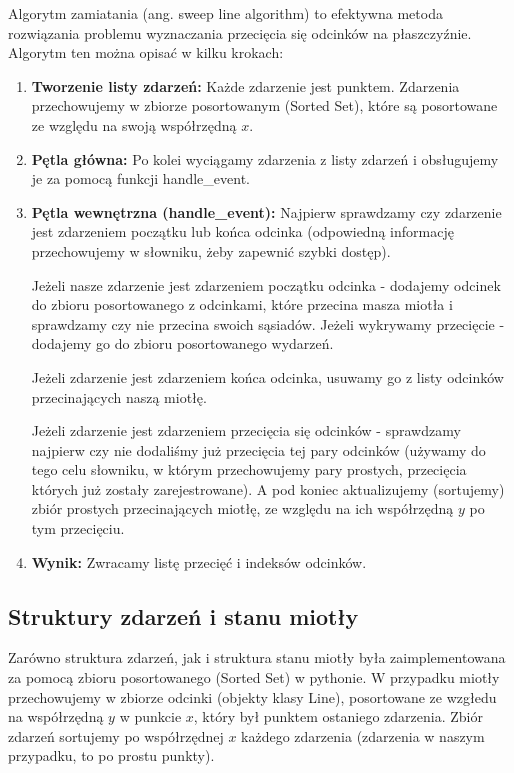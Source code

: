 \quad Algorytm zamiatania (ang. sweep line algorithm) to efektywna metoda rozwiązania problemu wyznaczania przecięcia się odcinków na płaszczyźnie. Algorytm ten można opisać w kilku krokach:


\begin{enumerate}
    \item \textbf{Tworzenie listy zdarzeń:} Każde zdarzenie jest punktem. Zdarzenia przechowujemy w zbiorze posortowanym (Sorted Set), które są posortowane ze względu na swoją współrzędną $x$.
    \item  \textbf{Pętla główna:}
    Po kolei wyciągamy zdarzenia z listy zdarzeń i obsługujemy je za pomocą funkcji handle\_event.

\item  \textbf{Pętla wewnętrzna (handle\_event):}
Najpierw sprawdzamy czy zdarzenie jest zdarzeniem początku lub końca odcinka (odpowiedną informację przechowujemy w słowniku, żeby zapewnić szybki dostęp).

Jeżeli nasze zdarzenie jest zdarzeniem początku odcinka - dodajemy odcinek do zbioru posortowanego z odcinkami, które przecina masza miotła i sprawdzamy czy nie przecina swoich sąsiadów. Jeżeli wykrywamy przecięcie - dodajemy go do zbioru posortowanego wydarzeń.

Jeżeli zdarzenie jest zdarzeniem końca odcinka, usuwamy go z listy odcinków przecinających naszą miotłę.

Jeżeli zdarzenie jest zdarzeniem przecięcia się odcinków - sprawdzamy najpierw czy nie dodaliśmy już przecięcia tej pary odcinków (używamy do tego celu słowniku, w którym przechowujemy pary prostych, przecięcia których już zostały zarejestrowane). 
A pod koniec aktualizujemy (sortujemy) zbiór prostych przecinających miotłę, ze względu na ich współrzędną $y$ po tym przecięciu.
\item  \textbf{Wynik:}
Zwracamy listę przecięć i indeksów odcinków.
\end{enumerate}

\subsection{Struktury zdarzeń i stanu miotły} 

Zarówno struktura zdarzeń, jak i struktura stanu miotły była zaimplementowana za pomocą zbioru posortowanego (Sorted Set) w pythonie. W przypadku miotły przechowujemy w zbiorze odcinki (objekty klasy Line), posortowane ze wzgłedu na współrzędną $y$ w punkcie $x$, który był punktem ostaniego zdarzenia. Zbiór zdarzeń sortujemy po współrzędnej $x$ każdego zdarzenia (zdarzenia w naszym przypadku, to po prostu punkty).

